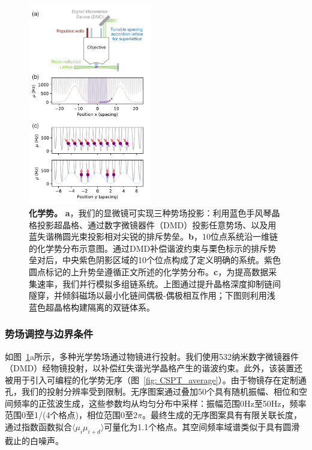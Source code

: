 \documentclass[preprint,superscriptaddress,floatfix, nofootinbib]{revtex4-2}
\begin{document}
\begin{figure}
    \centering
    \includegraphics[width=0.48\textwidth]{figures/chemical_potential.pdf}
    \caption{\textbf{化学势。} \textbf{a}，我们的显微镜可实现三种势场投影：利用蓝色手风琴晶格投影超晶格、通过数字微镜器件（DMD）投影任意势场、以及用蓝失谐椭圆光束投影相对尖锐的排斥势垒。\textbf{b}，10位点系统沿一维链的化学势分布示意图。通过DMD补偿谐波约束与栗色标示的排斥势垒对后，中央紫色阴影区域的10个位点构成了定义明确的系统。紫色圆点标记的上升势垒遵循正文所述的化学势分布。\textbf{c}，为提高数据采集速率，我们并行模拟多组链系统。上图通过提升晶格深度抑制链间隧穿，并倾斜磁场以最小化链间偶极-偶极相互作用；下图则利用浅蓝色超晶格构建隔离的双链体系。}
    \label{fig: chemical_potential}
\end{figure}
\subsubsection*{势场调控与边界条件}

如图~\ref{fig: chemical_potential}a所示，多种光学势场通过物镜进行投射。我们使用532纳米数字微镜器件（DMD）经物镜投射，以补偿红失谐光学晶格产生的谐波约束。此外，该装置还被用于引入可编程的化学势无序（图~\ref{fig: CSPT_average}）。由于物镜存在定制通孔，我们的投射分辨率受到限制。无序图案通过叠加50个具有随机振幅、相位和空间频率的正弦波生成，这些参数均从均匀分布中采样：振幅范围0Hz至50Hz，频率范围0至1/(4个格点)，相位范围0至$2\pi$。最终生成的无序图案具有有限关联长度，通过指数函数拟合$\langle\mu_i \mu_{i+d}\rangle$可量化为1.1个格点。其空间频率域谱类似于具有圆滑截止的白噪声。
\end{document}
